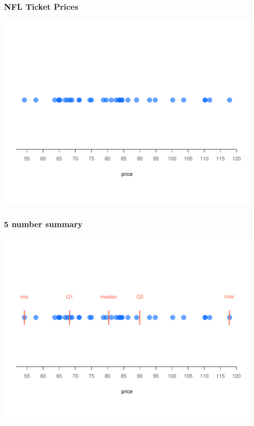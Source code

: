 \documentclass[12pt]{beamer}\usepackage[]{graphicx}\usepackage[]{color}
\newenvironment{knitrout}{}{} %
\begin{document}
\begin{frame}[fragile]
\frametitle{NFL Ticket Prices}
\begin{knitrout}\footnotesize
{}\color{fgcolor}

{\centering \includegraphics[width=.9\linewidth,height=.7\linewidth]{figure/unnamed-chunk-22-1} 

}



\end{knitrout}

\end{frame}


\begin{frame}[fragile]
\frametitle{5 number summary}
\begin{knitrout}\footnotesize
{}\color{fgcolor}

{\centering \includegraphics[width=.9\linewidth,height=.7\linewidth]{figure/unnamed-chunk-23-1} 

}



\end{knitrout}

\end{frame}
\end{document}
